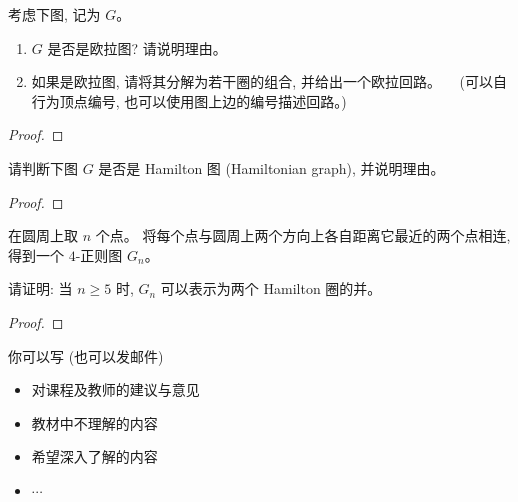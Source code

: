 \documentclass[a4paper, justified]{tufte-handout}
\begin{document}
\begin{problem}
  考虑下图, 记为 $G$。
  \begin{enumerate}[(1)]
    \item $G$ 是否是欧拉图? 请说明理由。
    \item 如果是欧拉图, 请将其分解为若干圈的组合, 并给出一个欧拉回路。
    　(可以自行为顶点编号, 也可以使用图上边的编号描述回路。)
  \end{enumerate}
\end{problem}

\begin{proof}
\end{proof}

\begin{problem}
  请判断下图 $G$ 是否是 Hamilton 图 (Hamiltonian graph), 并说明理由。
\end{problem}

\begin{proof}
\end{proof}

\begin{problem}
  在圆周上取 $n$ 个点。
  将每个点与圆周上两个方向上各自距离它最近的两个点相连,
  得到一个 $4$-正则图 $G_n$。

  \noindent 请证明: 当 $n \ge 5$ 时, $G_n$ 可以表示为两个 Hamilton 圈的并。
\end{problem}

\begin{proof}
\end{proof}


\begincorrection

\beginfb

你可以写 (也可以发邮件)
\begin{itemize}
  \item 对课程及教师的建议与意见
  \item 教材中不理解的内容
  \item 希望深入了解的内容
  \item $\cdots$
\end{itemize}
\end{document}
